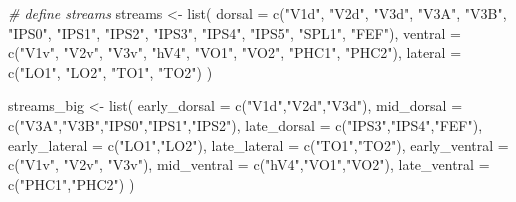 \documentclass[
]{article}
\newenvironment{Shaded}{\begin{snugshade}}{\end{snugshade}}
\newcommand{\AttributeTok}[1]{\textcolor[rgb]{0.77,0.63,0.00}{#1}}
\newcommand{\CommentTok}[1]{\textcolor[rgb]{0.56,0.35,0.01}{\textit{#1}}}
\newcommand{\FunctionTok}[1]{\textcolor[rgb]{0.00,0.00,0.00}{#1}}
\newcommand{\NormalTok}[1]{#1}
\newcommand{\OtherTok}[1]{\textcolor[rgb]{0.56,0.35,0.01}{#1}}
\newcommand{\StringTok}[1]{\textcolor[rgb]{0.31,0.60,0.02}{#1}}
\begin{document}
\begin{Shaded}
\begin{Highlighting}[]
\CommentTok{\# define streams}
\NormalTok{streams }\OtherTok{\textless{}{-}} \FunctionTok{list}\NormalTok{(}
  \AttributeTok{dorsal =} \FunctionTok{c}\NormalTok{(}\StringTok{"V1d"}\NormalTok{, }\StringTok{"V2d"}\NormalTok{, }\StringTok{"V3d"}\NormalTok{, }\StringTok{"V3A"}\NormalTok{, }\StringTok{"V3B"}\NormalTok{, }\StringTok{"IPS0"}\NormalTok{, }\StringTok{"IPS1"}\NormalTok{, }\StringTok{"IPS2"}\NormalTok{, }\StringTok{"IPS3"}\NormalTok{, }\StringTok{"IPS4"}\NormalTok{, }\StringTok{"IPS5"}\NormalTok{, }\StringTok{"SPL1"}\NormalTok{, }\StringTok{"FEF"}\NormalTok{),}
  \AttributeTok{ventral =} \FunctionTok{c}\NormalTok{(}\StringTok{"V1v"}\NormalTok{, }\StringTok{"V2v"}\NormalTok{, }\StringTok{"V3v"}\NormalTok{, }\StringTok{"hV4"}\NormalTok{, }\StringTok{"VO1"}\NormalTok{, }\StringTok{"VO2"}\NormalTok{, }\StringTok{"PHC1"}\NormalTok{, }\StringTok{"PHC2"}\NormalTok{),}
  \AttributeTok{lateral =} \FunctionTok{c}\NormalTok{(}\StringTok{"LO1"}\NormalTok{, }\StringTok{"LO2"}\NormalTok{, }\StringTok{"TO1"}\NormalTok{, }\StringTok{"TO2"}\NormalTok{)}
\NormalTok{)}

\NormalTok{streams\_big }\OtherTok{\textless{}{-}} \FunctionTok{list}\NormalTok{(}
  \AttributeTok{early\_dorsal =} \FunctionTok{c}\NormalTok{(}\StringTok{"V1d"}\NormalTok{,}\StringTok{"V2d"}\NormalTok{,}\StringTok{"V3d"}\NormalTok{),}
  \AttributeTok{mid\_dorsal =} \FunctionTok{c}\NormalTok{(}\StringTok{"V3A"}\NormalTok{,}\StringTok{"V3B"}\NormalTok{,}\StringTok{"IPS0"}\NormalTok{,}\StringTok{"IPS1"}\NormalTok{,}\StringTok{"IPS2"}\NormalTok{),}
  \AttributeTok{late\_dorsal =} \FunctionTok{c}\NormalTok{(}\StringTok{"IPS3"}\NormalTok{,}\StringTok{"IPS4"}\NormalTok{,}\StringTok{"FEF"}\NormalTok{),}
  \AttributeTok{early\_lateral =} \FunctionTok{c}\NormalTok{(}\StringTok{"LO1"}\NormalTok{,}\StringTok{"LO2"}\NormalTok{),}
  \AttributeTok{late\_lateral =} \FunctionTok{c}\NormalTok{(}\StringTok{"TO1"}\NormalTok{,}\StringTok{"TO2"}\NormalTok{),}
  \AttributeTok{early\_ventral =} \FunctionTok{c}\NormalTok{(}\StringTok{"V1v"}\NormalTok{, }\StringTok{"V2v"}\NormalTok{, }\StringTok{"V3v"}\NormalTok{),}
  \AttributeTok{mid\_ventral =} \FunctionTok{c}\NormalTok{(}\StringTok{"hV4"}\NormalTok{,}\StringTok{"VO1"}\NormalTok{,}\StringTok{"VO2"}\NormalTok{),}
  \AttributeTok{late\_ventral =} \FunctionTok{c}\NormalTok{(}\StringTok{"PHC1"}\NormalTok{,}\StringTok{"PHC2"}\NormalTok{)}
\NormalTok{)}


\end{Highlighting}
\end{Shaded}
\end{document}
